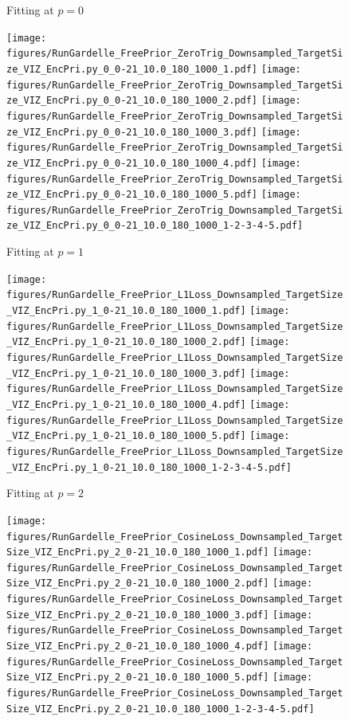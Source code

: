 \documentclass[si.tex]{subfiles}
\begin{document}
\begin{figure}
\centering

Fitting at $p=0$

\texttt{[image: figures/RunGardelle\_FreePrior\_ZeroTrig\_Downsampled\_TargetSize\_VIZ\_EncPri.py\_0\_0-21\_10.0\_180\_1000\_1.pdf]}
\texttt{[image: figures/RunGardelle\_FreePrior\_ZeroTrig\_Downsampled\_TargetSize\_VIZ\_EncPri.py\_0\_0-21\_10.0\_180\_1000\_2.pdf]}
\texttt{[image: figures/RunGardelle\_FreePrior\_ZeroTrig\_Downsampled\_TargetSize\_VIZ\_EncPri.py\_0\_0-21\_10.0\_180\_1000\_3.pdf]}
\texttt{[image: figures/RunGardelle\_FreePrior\_ZeroTrig\_Downsampled\_TargetSize\_VIZ\_EncPri.py\_0\_0-21\_10.0\_180\_1000\_4.pdf]}
\texttt{[image: figures/RunGardelle\_FreePrior\_ZeroTrig\_Downsampled\_TargetSize\_VIZ\_EncPri.py\_0\_0-21\_10.0\_180\_1000\_5.pdf]}
\texttt{[image: figures/RunGardelle\_FreePrior\_ZeroTrig\_Downsampled\_TargetSize\_VIZ\_EncPri.py\_0\_0-21\_10.0\_180\_1000\_1-2-3-4-5.pdf]}


Fitting at $p=1$

\texttt{[image: figures/RunGardelle\_FreePrior\_L1Loss\_Downsampled\_TargetSize\_VIZ\_EncPri.py\_1\_0-21\_10.0\_180\_1000\_1.pdf]}
\texttt{[image: figures/RunGardelle\_FreePrior\_L1Loss\_Downsampled\_TargetSize\_VIZ\_EncPri.py\_1\_0-21\_10.0\_180\_1000\_2.pdf]}
\texttt{[image: figures/RunGardelle\_FreePrior\_L1Loss\_Downsampled\_TargetSize\_VIZ\_EncPri.py\_1\_0-21\_10.0\_180\_1000\_3.pdf]}
\texttt{[image: figures/RunGardelle\_FreePrior\_L1Loss\_Downsampled\_TargetSize\_VIZ\_EncPri.py\_1\_0-21\_10.0\_180\_1000\_4.pdf]}
\texttt{[image: figures/RunGardelle\_FreePrior\_L1Loss\_Downsampled\_TargetSize\_VIZ\_EncPri.py\_1\_0-21\_10.0\_180\_1000\_5.pdf]}
\texttt{[image: figures/RunGardelle\_FreePrior\_L1Loss\_Downsampled\_TargetSize\_VIZ\_EncPri.py\_1\_0-21\_10.0\_180\_1000\_1-2-3-4-5.pdf]}


Fitting at $p=2$

\texttt{[image: figures/RunGardelle\_FreePrior\_CosineLoss\_Downsampled\_TargetSize\_VIZ\_EncPri.py\_2\_0-21\_10.0\_180\_1000\_1.pdf]}
\texttt{[image: figures/RunGardelle\_FreePrior\_CosineLoss\_Downsampled\_TargetSize\_VIZ\_EncPri.py\_2\_0-21\_10.0\_180\_1000\_2.pdf]}
\texttt{[image: figures/RunGardelle\_FreePrior\_CosineLoss\_Downsampled\_TargetSize\_VIZ\_EncPri.py\_2\_0-21\_10.0\_180\_1000\_3.pdf]}
\texttt{[image: figures/RunGardelle\_FreePrior\_CosineLoss\_Downsampled\_TargetSize\_VIZ\_EncPri.py\_2\_0-21\_10.0\_180\_1000\_4.pdf]}
\texttt{[image: figures/RunGardelle\_FreePrior\_CosineLoss\_Downsampled\_TargetSize\_VIZ\_EncPri.py\_2\_0-21\_10.0\_180\_1000\_5.pdf]}
\texttt{[image: figures/RunGardelle\_FreePrior\_CosineLoss\_Downsampled\_TargetSize\_VIZ\_EncPri.py\_2\_0-21\_10.0\_180\_1000\_1-2-3-4-5.pdf]}


\end{figure}
\end{document}
